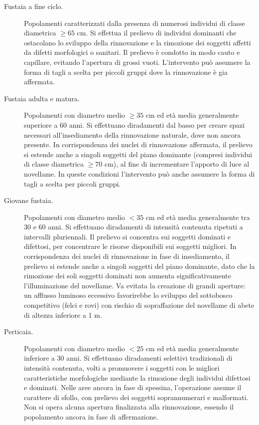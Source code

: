 \begin{description}

\item[Fustaia a fine ciclo.]

Popolamenti caratterizzati dalla presenza di numerosi individui di classe
diametrica $\geq 65$ cm. Si effettua il prelievo di individui dominanti che
ostacolano lo sviluppo della rinnovazione e la rimozione dei soggetti affetti da
difetti morfologici o sanitari. Il prelievo è condotto in modo cauto e
capillare, evitando l'apertura di grossi vuoti. L'intervento può assumere la
forma di tagli a scelta per piccoli gruppi dove la rinnovazione è gia affermata.

\item[Fustaia adulta e matura.]

Popolamenti con diametro medio $\geq 35$ cm ed età media generalmente superiore
a 60 anni. Si effettuano diradamenti dal basso per creare spazi necessari
all'insediamento della rinnovazione naturale, dove non ancora presente. In
corrispondenza dei nuclei di rinnovazione affermata, il prelievo si estende
anche a singoli soggetti del piano dominante (compresi individui di classe
diametrica $\geq 70$ cm), al fine di incrementare l'apporto di luce al
novellame. In queste condizioni l'intervento può anche assumere la forma di
tagli a scelta per piccoli gruppi.

\item[Giovane fustaia.]

Popolamenti con diametro medio $< 35$ cm ed età media generalmente tra 30 e 60
anni. Si effettuano diradamenti di intensità contenuta ripetuti a intervalli
pluriennali. Il prelievo si concentra sui soggetti dominati e difettosi, per
concentrare le risorse disponibili sui soggetti migliori. In corrispondenza dei
nuclei di rinnovazione in fase di insediamento, il prelievo si estende anche a
singoli soggetti del piano dominante, dato che la rimozione dei soli soggetti
dominati non aumenta significativamente l'illuminazione del novellame. Va
evitata la creazione di grandi aperture: un afflusso luminoso eccessivo
favorirebbe lo sviluppo del sottobosco competitivo (felci e rovi) con rischio di
sopraffazione del novellame di abete di altezza inferiore a 1 m.

\item[Perticaia.]

Popolamenti con diametro medio $< 25$ cm ed età media generalmente inferiore a
30 anni. Si effettuano diradamenti selettivi tradizionali di intensità
contenuta, volti a promuovere i soggetti con le migliori caratteristiche
morfologiche mediante la rimozione degli individui difettosi e dominati. Nelle
aree ancora in fase di spessina, l'operazione assume il carattere di sfollo, con
prelievo dei soggetti soprannumerari e malformati. Non si opera alcuna apertura
finalizzata alla rinnovazione, essendo il popolamento ancora in fase di
affermazione.

\end{description}

